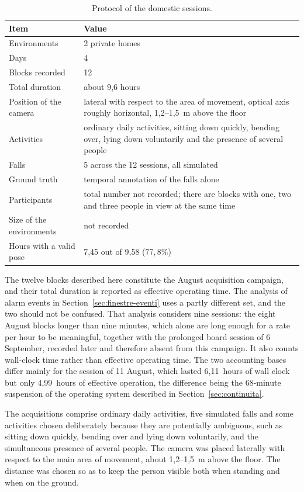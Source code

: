 \begin{table}[htbp]
\centering
\caption{Protocol of the domestic sessions.}
\label{tab:protocollo_domestico}
\begin{tabular}{@{}p{5.0cm}p{8.6cm}@{}}
\toprule
\textbf{Item} & \textbf{Value} \\
\midrule
Environments & 2 private homes \\
Days & 4 \\
Blocks recorded & 12 \\
Total duration & about 9,6 hours \\
Position of the camera & lateral with respect to the area of movement, optical axis roughly horizontal, 1,2--1,5~m above the floor \\
Activities & ordinary daily activities, sitting down quickly, bending over, lying down voluntarily and the presence of several people \\
Falls & 5 across the 12 sessions, all simulated \\
Ground truth & temporal annotation of the falls alone \\
Participants & total number not recorded; there are blocks with one, two and three people in view at the same time \\
Size of the environments & not recorded \\
Hours with a valid pose & 7,45 out of 9,58 ($77,8\%$) \\
\bottomrule
\end{tabular}
\end{table}

The twelve blocks described here constitute the August acquisition campaign, and their total duration is reported as effective operating time. The analysis of alarm events in Section~\ref{sec:finestre-eventi} uses a partly different set, and the two should not be confused. That analysis considers nine sessions: the eight August blocks longer than nine minutes, which alone are long enough for a rate per hour to be meaningful, together with the prolonged board session of 6 September, recorded later and therefore absent from this campaign. It also counts wall-clock time rather than effective operating time. The two accounting bases differ mainly for the session of 11 August, which lasted 6,11~hours of wall clock but only 4,99~hours of effective operation, the difference being the 68-minute suspension of the operating system described in Section~\ref{sec:continuita}.

The acquisitions comprise ordinary daily activities, five simulated falls and some activities chosen deliberately because they are potentially ambiguous, such as sitting down quickly, bending over and lying down voluntarily, and the simultaneous presence of several people. The camera was placed laterally with respect to the main area of movement, about 1,2--1,5~m above the floor. The distance was chosen so as to keep the person visible both when standing and when on the ground.

